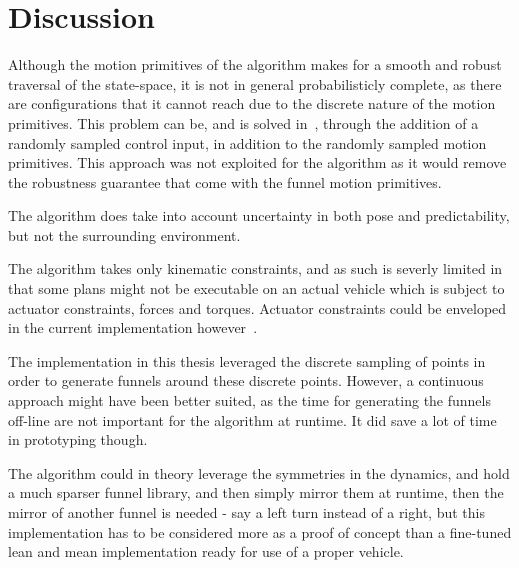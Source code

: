 \chapter{Discussion}

Although the motion primitives of the \rrtfunnel{} algorithm makes for a smooth
and robust traversal of the state-space, it is not in general probabilisticly
complete, as there are configurations that it cannot reach due to the discrete
nature of the motion primitives. This problem can be, and is solved
in~\cite{vonasekGlobalMotionPlanning2013}, through the addition of a randomly
sampled control input, in addition to the randomly sampled motion primitives.
This approach was not exploited for the \rrtfunnel{} algorithm as it would
remove the robustness guarantee that come with the funnel motion primitives.

The algorithm does take into account uncertainty in both pose and
predictability, but not the surrounding environment.

The algorithm takes only kinematic constraints, and as such is severly limited
in that some plans might not be executable on an actual vehicle which is subject
to actuator constraints, forces and torques. Actuator constraints could be
enveloped in the current implementation
however~\cite{majumdarFunnelLibrariesRealtime2017}.

The implementation in this thesis leveraged the discrete sampling of points in
order to generate funnels around these discrete points. However, a continuous
approach might have been better suited, as the time for generating the funnels
off-line are not important for the algorithm at runtime. It did save a lot of
time in prototyping though.

The algorithm could in theory leverage the symmetries in the dynamics, and hold
a much sparser funnel library, and then simply mirror them at runtime, then the
mirror of another funnel is needed - say a left turn instead of a right, but
this implementation has to be considered more as a proof of concept than a
fine-tuned lean and mean implementation ready for use of a proper vehicle.

